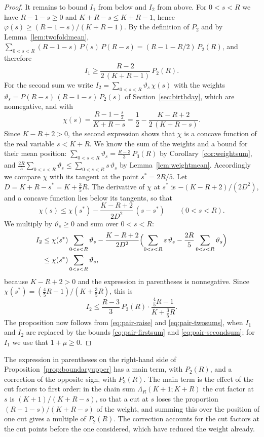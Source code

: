 \documentclass{amsart}
\theoremstyle{definition}
\theoremstyle{remark}
\numberwithin{equation}{section}
\begin{document}
\begin{proof}
It remains to bound $I_1$ from below and $I_2$ from above. For
$0<s<R$ we have $R-1-s\ge0$ and $K+R-s\le K+R-1$, hence
$\varphi(s)\ge(R-1-s)/(K+R-1)$. By the definition of $P_2$ and by
Lemma~\ref{lem:twofoldmean},
$\sum_{0<s<R}(R-1-s)\,P(s)\,P(R-s)=(R-1-R/2)\,P_2(R)$, and therefore
\begin{equation}\label{eq:pair-firstsum}
I_1\ge\frac{R-2}{2\,(K+R-1)}\,P_2(R).
\end{equation}
For the second sum we write $I_2=\sum_{0<s<R}\vartheta_s\,\chi(s)$ with
the weights $\vartheta_s=P(R-s)\,(R-1-s)\,P_2(s)$ of
Section~\ref{sec:birthday}, which are nonnegative, and with
\[
\chi(s)=\frac{R-1-\frac s2}{K+R-s}
=\frac12-\frac{K-R+2}{2\,(K+R-s)}.
\]
Since $K-R+2>0$, the second expression shows that $\chi$ is a concave
function of the real variable $s<K+R$. We know the sum of the weights and
a bound for their mean position:
$\sum_{0<s<R}\vartheta_s=\frac{R-3}{3}\,P_3(R)$ by
Corollary~\ref{cor:weightsum}, and
$\frac{2R}{5}\sum_{0<s<R}\vartheta_s\le\sum_{0<s<R}s\,\vartheta_s$ by
Lemma~\ref{lem:weightmean}. Accordingly we compare $\chi$ with its tangent
at the point $s^*=2R/5$. Let $D=K+R-s^*=K+\frac35R$. The derivative of
$\chi$ at $s^*$ is $-(K-R+2)/(2D^2)$, and a concave function lies below its
tangents, so that
\[
\chi(s)\le\chi(s^*)-\frac{K-R+2}{2D^2}\,(s-s^*)\qquad(0<s<R).
\]
We multiply by $\vartheta_s\ge0$ and sum over $0<s<R$:
\begin{align*}
I_2&\le\chi(s^*)\sum_{0<s<R}\vartheta_s-\frac{K-R+2}{2D^2}
\Bigl(\sum_{0<s<R}s\,\vartheta_s-\frac{2R}{5}\sum_{0<s<R}\vartheta_s\Bigr)\\
&\le\chi(s^*)\sum_{0<s<R}\vartheta_s,
\end{align*}
because $K-R+2>0$ and the expression in parentheses is nonnegative. Since
$\chi(s^*)=(\frac45R-1)/(K+\frac35R)$, this is
\begin{equation}\label{eq:pair-secondsum}
I_2\le\frac{R-3}{3}\,P_3(R)\cdot\frac{\frac45R-1}{K+\frac35R}.
\end{equation}
The proposition now follows from \eqref{eq:pair-raise} and
\eqref{eq:pair-twosums}, when $I_1$ and $I_2$ are replaced by the
bounds \eqref{eq:pair-firstsum} and \eqref{eq:pair-secondsum}; for $I_1$
we use that $1+\mu\ge0$.
\end{proof}

The expression in parentheses on the right-hand side of
Proposition~\ref{prop:boundaryupper} has a main term, with
$P_2(R)$, and a correction of the opposite sign, with $P_3(R)$. The main
term is the effect of the cut factors to first order: in the chain sum
$\Lambda_R(K+1;K+R)$ the cut factor at $s$ is $(K+1)/(K+R-s)$, so that a cut
at $s$ loses the proportion $(R-1-s)/(K+R-s)$ of the weight, and summing
this over the position of one cut gives a multiple of $P_2(R)$. The
correction accounts for the cut factors at the cut points before the one
considered, which have reduced the weight already.
\end{document}
